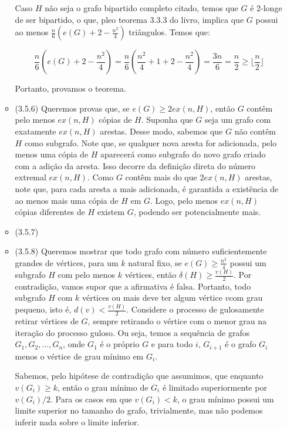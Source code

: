 \documentclass{article}
\begin{document}
\begin{enumerate}
\begin{itemize}
		            Caso \(H\) não seja o grafo bipartido completo citado, temos que \(G\) é 2-longe de ser bipartido, o que, pleo teorema
		            3.3.3 do livro, implica que \(G\) possui ao menos \(\frac{n}{6}(e(G) + 2 - \frac{n^2}{4})\) triângulos. Temos que:

		            \[\frac{n}{6}(e(G) + 2 - \frac{n^2}{4}) = \frac{n}{6}(\frac{n^2}{4} + 1 + 2 - \frac{n^2}{4}) = \frac{3n}{6} = \frac{n}{2} \geq \lfloor\frac{n}{2}\rfloor\]

		            Portanto, provamos o teorema.

		      \item (3.5.6)
		            Queremos provas que, se \(e(G) \geq 2 ex(n, H)\), então \(G\) contêm pelo menos \(ex(n, H)\) cópias de \(H\).
		            Suponha que \(G\) seja um grafo com exatamente \(ex(n, H)\) arestas. Desse modo, sabemos que \(G\) não contêm \(H\) como subgrafo.
		            Note que, se qualquer nova aresta for adicionada, pelo menos uma cópia de \(H\) aparecerá como subgrafo do novo grafo criado com a adição da aresta.
		            Isso decorre da definição direta do número extremal \(ex(n, H)\). Como \(G\) contêm mais do que \(2 ex(n, H)\) arestas, note que, para cada aresta a mais adicionada, é garantida a existência
		            de ao menos mais uma cópia de \(H\) em \(G\). Logo, pelo menos \(ex(n, H)\) cópias diferentes de \(H\) existem \(G\), podendo ser potencialmente mais.

		      \item (3.5.7)
		      \item (3.5.8)
		            Queremos mostrar que todo grafo com número suficientemente grandes de vértices,
		            para um \(k\) natural fixo, se \(e(G) \geq \frac{n^2}{4}\) possui um subgrafo \(H\) com
		            pelo menos \(k\) vértices, então \(\delta(H) \geq \frac{v(H)}{2}\).
		            Por contradição, vamos supor que a afirmativa é falsa. Portanto, todo subgrafo \(H\)
		            com \(k\) vértices ou mais deve ter algum vértice \(v\)com grau pequeno, isto é, \(d(v) < \frac{v(H)}{2}\).
		            Considere o processo de gulosamente retirar vértices de \(G\), sempre retirando o vértice com o menor grau na
		            iteração do processo guloso. Ou seja, temos a sequência de grafos \(G_1, G_2, \dots, G_n\), onde \(G_1\) é o próprio \(G\)
		            e para todo \(i\), \(G_{i+1}\) é o grafo \(G_i\) menos o vértice de grau mínimo em \(G_i\).

		            Sabemos, pelo hipótese de contradição que assumimos, que enquanto \(v(G_i) \geq k\), então o grau mínimo de \(G_i\)
		            é limitado superiormente por \(v(G_i)/2\). Para os casos em que \(v(G_i) < k\), o grau mínimo possui um limite superior
		            no tamanho do grafo, trivialmente, mas não podemos inferir nada sobre o limite inferior.


\end{itemize}
\end{enumerate}
\end{document}
